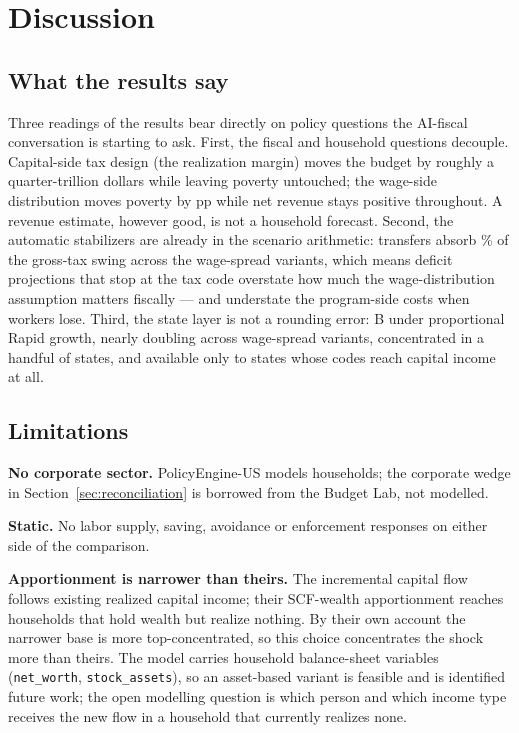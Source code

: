 \section{Discussion}\label{sec:discussion}

\subsection{What the results say}

Three readings of the results bear directly on policy questions the AI-fiscal
conversation is starting to ask. First, the fiscal and household questions
decouple. Capital-side tax design (the realization margin) moves the budget
by roughly a quarter-trillion dollars while leaving poverty untouched; the wage-side
distribution moves poverty by \genRapidPovSpanPp pp while net revenue stays
positive throughout. A revenue estimate, however good, is not a household
forecast. Second, the automatic stabilizers are already in the scenario
arithmetic: transfers absorb \genTransferAbsorbPct\% of the gross-tax swing
across the wage-spread variants, which means deficit projections that stop
at the tax code overstate how much the wage-distribution assumption matters
fiscally --- and understate the program-side costs when workers lose. Third,
the state layer is not a rounding error: \genRapidPropState B under
proportional Rapid growth, nearly doubling across wage-spread variants,
concentrated in a handful of states, and available only to states whose
codes reach capital income at all.

\subsection{Limitations}

\textbf{No corporate sector.} PolicyEngine-US models households; the
corporate wedge in Section~\ref{sec:reconciliation} is borrowed from the
Budget Lab, not modelled.

\textbf{Static.} No labor supply, saving, avoidance or enforcement
responses on either side of the comparison.

\textbf{Apportionment is narrower than theirs.} The incremental capital flow
follows existing realized capital income; their SCF-wealth apportionment
reaches households that hold wealth but realize nothing. By their own
account the narrower base is more top-concentrated, so this choice
concentrates the shock more than theirs. The model carries household
balance-sheet variables (\texttt{net\_worth}, \texttt{stock\_assets}), so an
asset-based variant is feasible and is identified future work; the open
modelling question is which person and which income type receives the new
flow in a household that currently realizes none.

